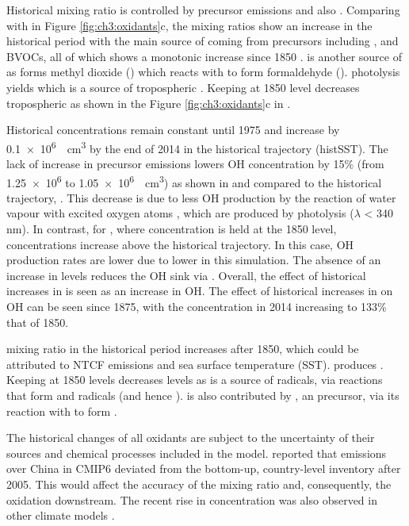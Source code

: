 Historical  mixing ratio is controlled by  precursor emissions and also . Comparing \histsst{} with \sstpio{} in Figure \ref{fig:ch3:oxidants}c, the  mixing ratios show an increase in the historical period with the main source of  coming from  precursors including ,  and BVOCs, all of which shows a monotonic increase since 1850 \citep{griffithsTroposphericOzoneCMIP62021}.  is another source of  as  forms methyl dioxide () which reacts with  to form formaldehyde ().  photolysis yields  which is a source of tropospheric . Keeping  at 1850 level decreases tropospheric  as shown in the Figure \ref{fig:ch3:oxidants}c in \sstpich{}.


Historical  concentrations remain constant until 1975 and increase by \qty{0.1e6}{\per\centi\metre\cubed} by the end of 2014 in the historical trajectory (histSST). The lack of increase in  precursor emissions lowers OH concentration by 15\% (from \num{1.25e6} to \qty{1.05e6}{\per\centi\metre\cubed}) as shown in \sstpio{} and \sstpintcf{} compared to the historical trajectory, \histsst{}. This decrease is due to less OH production by the reaction of water vapour with excited oxygen atoms , which are produced by  photolysis ($\lambda$ < 340 nm). In contrast, for \sstpich{}, where  concentration is held at the 1850 level,  concentrations increase above the historical trajectory. In this case, OH production rates are lower due to lower  in this simulation. The absence of an increase in  levels reduces the OH sink via . Overall, the effect of historical increases in  is seen as an increase in OH. The effect of historical increases in  on OH can be seen since 1875, with the  concentration in 2014 increasing to 133\% that of 1850. 


 mixing ratio in the historical period increases after 1850, which could be attributed to NTCF emissions and sea surface temperature (SST).  produces . Keeping  at 1850 levels decreases  levels as  is a source of  radicals, via reactions that form  and  radicals (and hence ).  is also contributed by , an  precursor, via its reaction with  to form . 


The historical changes of all oxidants are subject to the uncertainty of their sources and chemical processes included in the model. \citet{fanComparisonAnthropogenicEmission2022} reported that  emissions over China in CMIP6 deviated from the bottom-up, country-level inventory after 2005. This would affect the accuracy of the  mixing ratio and, consequently, the oxidation downstream. The recent rise in  concentration was also observed in other climate models \citep{zhaoIntermodelComparisonGlobal2019}. 


